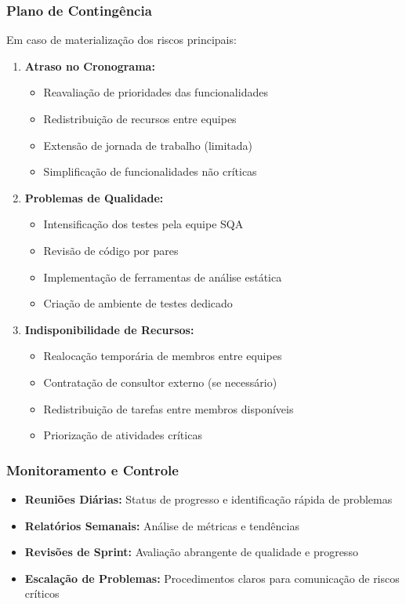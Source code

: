 \subsubsection{Plano de Contingência}

Em caso de materialização dos riscos principais:

\begin{enumerate}
    \item \textbf{Atraso no Cronograma:}
    \begin{itemize}
        \item Reavaliação de prioridades das funcionalidades
        \item Redistribuição de recursos entre equipes
        \item Extensão de jornada de trabalho (limitada)
        \item Simplificação de funcionalidades não críticas
    \end{itemize}
    
    \item \textbf{Problemas de Qualidade:}
    \begin{itemize}
        \item Intensificação dos testes pela equipe SQA
        \item Revisão de código por pares
        \item Implementação de ferramentas de análise estática
        \item Criação de ambiente de testes dedicado
    \end{itemize}
    
    \item \textbf{Indisponibilidade de Recursos:}
    \begin{itemize}
        \item Realocação temporária de membros entre equipes
        \item Contratação de consultor externo (se necessário)
        \item Redistribuição de tarefas entre membros disponíveis
        \item Priorização de atividades críticas
    \end{itemize}
\end{enumerate}

\subsubsection{Monitoramento e Controle}

\begin{itemize}
    \item \textbf{Reuniões Diárias:} Status de progresso e identificação rápida de problemas
    \item \textbf{Relatórios Semanais:} Análise de métricas e tendências
    \item \textbf{Revisões de Sprint:} Avaliação abrangente de qualidade e progresso
    \item \textbf{Escalação de Problemas:} Procedimentos claros para comunicação de riscos críticos
\end{itemize}
